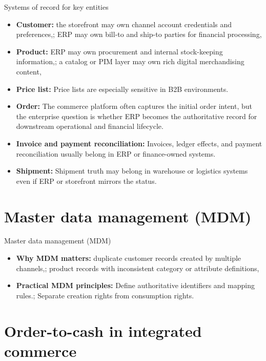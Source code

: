 \documentclass[aspectratio=169]{beamer}
\begin{document}
\begin{frame}{Systems of record for key entities}
  \begin{itemize}
    \item \textbf{Customer:} the storefront may own channel account credentials and preferences,; ERP may own bill-to and ship-to parties for financial processing,
    \item \textbf{Product:} ERP may own procurement and internal stock-keeping information,; a catalog or PIM layer may own rich digital merchandising content,
    \item \textbf{Price list:} Price lists are especially sensitive in B2B environments.
    \item \textbf{Order:} The commerce platform often captures the initial order intent, but the enterprise question is whether ERP becomes the authoritative record for downstream operational and financial lifecycle.
    \item \textbf{Invoice and payment reconciliation:} Invoices, ledger effects, and payment reconciliation usually belong in ERP or finance-owned systems.
    \item \textbf{Shipment:} Shipment truth may belong in warehouse or logistics systems even if ERP or storefront mirrors the status.
  \end{itemize}
\end{frame}

\section{Master data management (MDM)}

\begin{frame}{Master data management (MDM)}
  \begin{itemize}
    \item \textbf{Why MDM matters:} duplicate customer records created by multiple channels,; product records with inconsistent category or attribute definitions,
    \item \textbf{Practical MDM principles:} Define authoritative identifiers and mapping rules.; Separate creation rights from consumption rights.
  \end{itemize}
\end{frame}

\section{Order-to-cash in integrated commerce}
\end{document}
